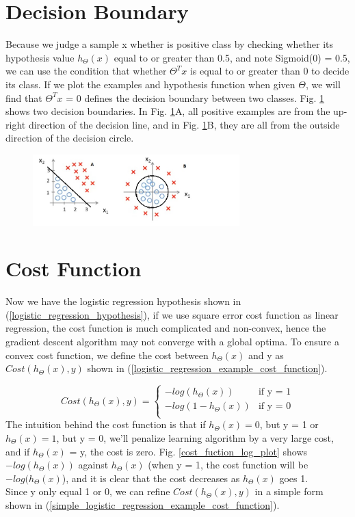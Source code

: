\documentclass{article}
\begin{document}
\section{Decision Boundary}
Because we judge a sample x whether is positive class by checking whether its hypothesis value $h_{\Theta}(x)$ equal to or greater than 0.5, and note Sigmoid(0) = 0.5, we can use the condition that whether $\Theta^{T}x$ is equal to or greater than 0 to decide its class. If we plot the examples and hypothesis function when given $\Theta$, we will find that $\Theta^{T}x$ = 0 defines the decision boundary between two classes. Fig. \ref{decision_boundary} shows two decision boundaries. In Fig. \ref{decision_boundary}A, all positive examples are from the up-right direction of the decision line, and in Fig. \ref{decision_boundary}B, they are all from the outside direction of the decision circle.

\begin{figure}[ht]
  \centering
  \includegraphics[width=8cm]{Figure3.jpg}\\
  \caption{}\label{decision_boundary}
\end{figure}

\section{Cost Function}
Now we have the logistic regression hypothesis shown in (\ref{logistic_regression_hypothesis}), if we use square error cost function as linear regression, the cost function is much complicated and non-convex, hence the gradient descent algorithm may not converge with a global optima. To ensure a convex cost function, we define the cost between $h_{\Theta}(x)$ and y as $Cost(h_{\Theta}(x), y)$ shown in (\ref{logistic_regression_example_cost_function}).

\begin{equation}\label{logistic_regression_example_cost_function}
Cost(h_{\Theta}(x), y) = \left\{ \begin{array}{ll}
-log(h_{\Theta}(x)) & \textrm{if y = 1}\\
-log(1 - h_{\Theta}(x)) & \textrm{if y = 0}\\
\end{array} \right.
\end{equation}
The intuition behind the cost function is that if $h_{\Theta}(x) = 0$, but y = 1 or $h_{\Theta}(x) = 1$, but y = 0, we'll penalize learning algorithm by a very large cost, and if $h_{\Theta}(x)$ = y, the cost is zero. Fig. \ref{cost_fuction_log_plot} shows $-log(h_{\Theta}(x))$ against $h_{\Theta}(x)$ (when y = 1, the cost function will be $-log(h_{\Theta}(x)$), and it is clear that the cost decreases as $h_{\Theta}(x)$ goes 1.
\\
Since y only equal 1 or 0, we can refine $Cost(h_{\Theta}(x), y)$ in a simple form shown in (\ref{simple_logistic_regression_example_cost_function}).
\end{document}
